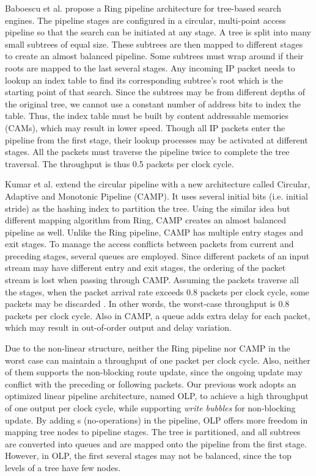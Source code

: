 \documentclass{sigcomm-alternate}
\begin{document}
Baboescu et al. \cite{isca05:baboescu} propose a Ring pipeline architecture for tree-based search engines. The pipeline stages are configured in a circular, multi-point access pipeline so that the search can be initiated at any stage. A tree is split into many small subtrees of equal size. These subtrees are then mapped to different stages to create an almost balanced pipeline. Some subtrees must wrap around if their roots are mapped to the last several stages. Any incoming IP packet needs to lookup an index table to find its corresponding subtree's root which is the starting point of that search. Since the subtrees may be from different depths of the original tree, we cannot use a constant number of address bits to index the table. Thus, the index table must be built by content addressable memories (CAMs), which may result in lower speed. Though all IP packets enter the pipeline from the first stage, their lookup processes may be activated at different stages. All the packets must traverse the pipeline twice to complete the tree traversal. The throughput is thus 0.5 packets per clock cycle.

Kumar et al. \cite{ancs06:kumar} extend the circular pipeline with a new architecture called Circular, Adaptive and Monotonic Pipeline (CAMP). It uses several initial bits (i.e. initial stride) as the hashing index to partition the tree. Using the similar idea but different mapping algorithm from Ring\cite{isca05:baboescu}, CAMP creates an almost balanced pipeline as well. Unlike the Ring pipeline, CAMP has multiple entry stages and exit stages. To manage the access conflicts between packets from current and preceding stages, several queues are employed. Since different packets of an input stream may have different entry and exit stages, the ordering of the packet stream is lost when passing through CAMP. Assuming the packets traverse all the stages, when the packet arrival rate exceeds 0.8 packets per clock cycle, some packets may be discarded \cite{ancs06:kumar}. In other words, the worst-case throughput is 0.8 packets per clock cycle. Also in CAMP, a queue adds extra delay for each packet, which may result in out-of-order output and delay variation.


Due to the non-linear structure, neither the Ring pipeline nor CAMP in the worst case can maintain a throughput of one packet per clock cycle. Also, neither of them supports the non-blocking route update, since the ongoing update may conflict with the preceding or following packets. Our previous work \cite{hoti07:jiang} adopts an optimized linear pipeline architecture, named OLP, to achieve a high throughput of one output per clock cycle, while supporting \textit{write bubbles} \cite{infocom03:basu} for non-blocking update. By adding s (no-operations) in the pipeline, OLP offers more freedom in mapping tree nodes to pipeline stages. The tree is partitioned, and all subtrees are converted into queues and are mapped onto the pipeline from the first stage. However, in OLP, the first several stages may not be balanced, since the top levels of a tree have few nodes. 
\end{document}
